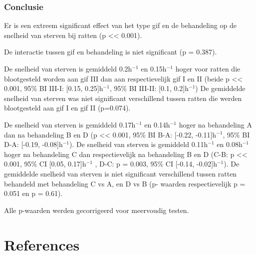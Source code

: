 \documentclass[
  12pt,dutch,coursenotes]{book}
\theoremstyle{definition}
\theoremstyle{definition}
\theoremstyle{definition}
\theoremstyle{definition}
\theoremstyle{remark}
\begin{document}
\hypertarget{conclusie-3}{%
\subsection{Conclusie}\label{conclusie-3}}

Er is een extreem significant effect van het type gif en de behandeling op de snelheid van sterven bij ratten (p \textless\textless{} 0.001).

De interactie tussen gif en behandeling is niet significant (p = 0.387).

De snelheid van sterven is gemiddeld 0.2h\(^{-1}\) en 0.15h\(^{-1}\) hoger voor ratten die blootgesteld worden aan gif III dan aan respectievelijk gif I en II (beide p \textless\textless{} 0.001, 95\% BI III-I: {[}0.15, 0.25{]}h\(^{-1}\), 95\% BI III-II: {[}0.1, 0.2{]}h\(^{-1}\))
De gemiddelde snelheid van sterven was niet significant verschillend tussen ratten die werden blootgesteld aan gif I en gif II (p=0.074).

De snelheid van sterven is gemiddeld 0.17h\(^{-1}\) en 0.14h\(^{-1}\) hoger na behandeling A dan na behandeling B en D (p \textless\textless{} 0.001, 95\% BI B-A: {[}-0.22, -0.11{]}h\(^{-1}\), 95\% BI D-A: {[}-0.19, -0.08{]}h\(^{-1}\)).
De snelheid van sterven is gemiddeld 0.11h\(^{-1}\) en 0.08h\(^{-1}\) hoger na behandeling C dan respectievelijk na behandeling B en D (C-B: p \textless\textless{} 0.001, 95\% CI {[}0.05, 0.17{]}h\(^{-1}\) , D-C: p = 0.003, 95\% CI {[}-0.14, -0.02{]}h\(^{-1}\)).
De gemiddelde snelheid van sterven is niet significant verschillend tussen ratten behandeld met behandeling C vs A, en D vs B (p- waarden respectievelijk p = 0.051 en p = 0.61).

Alle p-waarden werden gecorrigeerd voor meervoudig testen.

\hypertarget{references}{%
\chapter{References}\label{references}}

  
\end{document}

